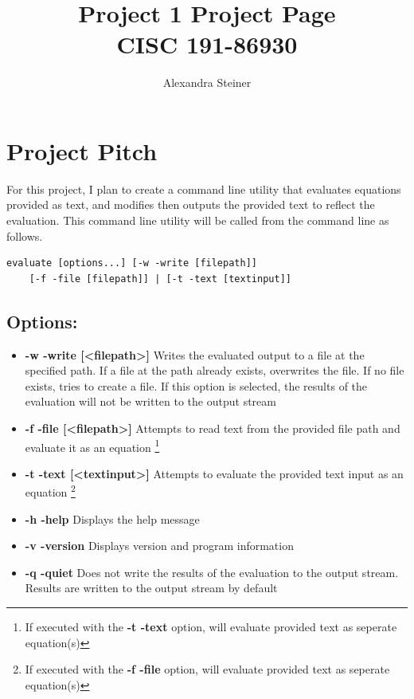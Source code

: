 \documentclass{article}
\title{%
	Project 1 Project Page\\
    \large CISC 191-86930}
\author{Alexandra Steiner}
\begin{document}
\maketitle

\tableofcontents

\newpage

\section{Project Pitch}
For this project, I plan to create a command line utility that evaluates equations provided as text, and modifies then outputs the provided text to reflect the evaluation. This command line utility will be called from the command line as follows.

\begin{lstlisting} 
evaluate [options...] [-w -write [filepath]]
	[-f -file [filepath]] | [-t -text [textinput]] 
\end{lstlisting}

\subsection{Options:}
\begin{itemize}
	\item \textbf{-w -write {[\textless filepath\textgreater]}} Writes the evaluated output to a file at the specified path. If a file at the path already exists, overwrites the file. If no file exists, tries to create a file. If this option is selected, the results of the evaluation will not be written to the output stream
	\item \textbf{-f -file {[\textless filepath\textgreater]}} Attempts to read text from the provided file path and evaluate it as an equation \footnote{If executed with the \textbf{-t -text} option, will evaluate provided text as seperate equation(s)}
	\item \textbf{-t -text {[\textless textinput\textgreater]}} Attempts to evaluate the provided text input as an equation \footnote{If executed with the \textbf{-f -file} option, will evaluate provided text as seperate equation(s)}
	\item \textbf{-h -help} Displays the help message
	\item \textbf{-v -version} Displays version and program information
	\item \textbf{-q -quiet} Does not write the results of the evaluation to the output stream. Results are written to the output stream by default
\end{itemize}
\end{document}
